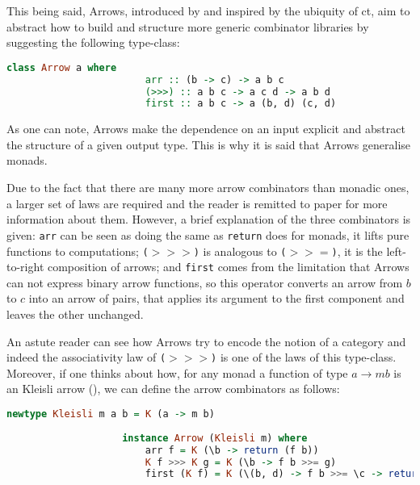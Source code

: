 \documentclass[
  oneside,
  11pt, a4paper,
  footinclude=true,
  headinclude=true,
  cleardoublepage=empty
]{scrbook}
\theoremstyle{definition}
\theoremstyle{definition}
\begin{document}
    	        This being said, Arrows, introduced by \cite{Hughes:2000:GMA:347238.347246} and inspired by the ubiquity of \gls{ct}, aim to abstract how to build and structure more generic combinator libraries by suggesting the following type-class:
    	        
                \begin{lstlisting}[mathescape, language=Haskell, caption={Arrow type-class},captionpos=b]
                    class Arrow a where
                        arr :: (b -> c) -> a b c
                        (>>>) :: a b c -> a c d -> a b d
                        first :: a b c -> a (b, d) (c, d)
    	        \end{lstlisting}{}
    	       
    	       As one can note, Arrows make the dependence on an input explicit and abstract the structure of a given output type. This is why it is said that Arrows generalise monads.
    	       
    	       Due to the fact that there are many more arrow combinators than monadic ones, a larger set of laws are required and the reader is remitted to \cite{Hughes:2000:GMA:347238.347246} paper for more information about them. However, a brief explanation of the three combinators is given: \texttt{arr} can be seen as doing the same as \texttt{return} does for monads, it lifts pure functions to computations; \texttt{($>>>$)} is analogous to \texttt{($>>=$)}, it is the left-to-right composition of arrows; and \texttt{first} comes from the limitation that Arrows can not express binary arrow functions, so this operator converts an arrow from $b$ to $c$ into an arrow of pairs, that applies its argument to the first component and leaves the other unchanged.
    	       
    	       An astute reader can see how Arrows try to encode the notion of a category and indeed the associativity law of \texttt{($>>>$)} is one of the laws of this type-class. Moreover, if one thinks about how, for any monad a function of type $a \rightarrow m b$ is an Kleisli arrow (\cite{Awodey:2010:CT:2060081}), we can define the arrow combinators as follows:
    	        
                \begin{lstlisting}[mathescape, language=Haskell, caption={Arrow type-class},captionpos=b]
                    newtype Kleisli m a b = K (a -> m b)
                
                    instance Arrow (Kleisli m) where
                        arr f = K (\b -> return (f b))
                        K f >>> K g = K (\b -> f b >>= g)
                        first (K f) = K (\(b, d) -> f b >>= \c -> return (c, d))
                \end{lstlisting}{}
                
\end{document}
